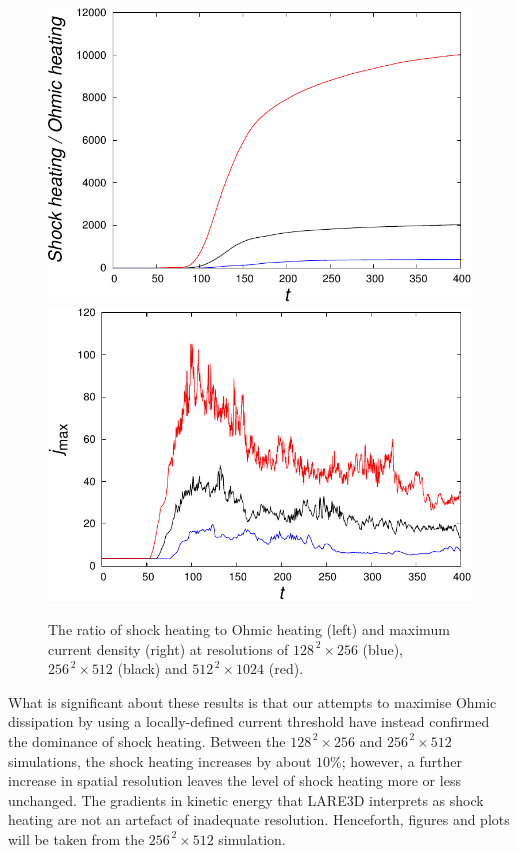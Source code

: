\documentclass{./packages/rs/rsproca}
\begin{document}
\begin{figure}[h!]
  \center  
  \includegraphics[scale=0.5]{./gnuplot/ht_visc_ohmic}
  \includegraphics[scale=0.5]{./gnuplot/j_max}
  \caption{\small{The ratio of shock heating to Ohmic heating (left) and maximum current density (right) at resolutions of $128^{\,2} \times 256$ (blue), $256^{\,2} \times 512$ (black) and $512^{\,2} \times 1024$ (red).}}
  \label{ht_visc_ohmic}
\end{figure}

What is significant about these results is that our attempts to maximise Ohmic dissipation by using a locally-defined current threshold have instead confirmed the dominance of shock heating. Between the $128^{\,2} \times 256$ and $256^{\,2} \times 512$ simulations, the shock heating increases by about $10\%$; however, a further increase in spatial resolution leaves the level of shock heating more or less unchanged. The gradients in kinetic energy that LARE3D interprets as shock heating are not an artefact of inadequate resolution. Henceforth, figures and plots will be taken from the $256^{\,2} \times 512$ simulation.
\end{document}
